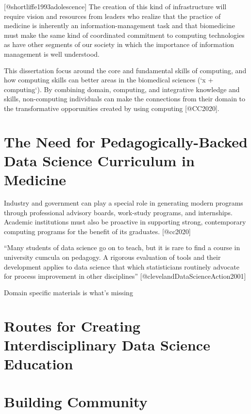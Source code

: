 \documentclass[../main.tex]{subfiles}
\begin{document}
        [@shortliffe1993adolescence]
        The creation of this kind of infrastructure will require vision and resources from leaders who realize that the practice of medicine is inherently an information-management task and that biomedicine must make the same kind of coordinated commitment to computing technologies as have other segments of our society in which the importance of information management is well understood.

        This dissertation focus around the core and fundamental skills
        of computing, and how computing skills can better areas in the biomedical sciences (`x + computing`).
        By combining domain, computing, and integrative knowledge and skills,
        non-computing individuals can make the connections from their domain to the transformative opporunities
        created by using computing [@CC2020].

    \section{The Need for Pedagogically-Backed Data Science Curriculum in Medicine}
        \label{se:intro-ds-edu-gaps}
        
        Industry and government can play a special role in generating modern programs through
        professional advisory boards, work-study programs, and internships.
        Academic institutions must also be proactive in
        supporting strong, contemporary computing programs for the benefit of its graduates. [@cc2020]
    
        ``Many students of data science
        go on to teach, but it is rare to find a course in university cumcula on pedagogy.
        A
        rigorous evaluation
        of tools and their development applies to data science that which statisticians routinely advocate for
        process improvement in other disciplines'' [@clevelandDataScienceAction2001]
        
        Domain specific materials is what's missing
        

    \section{Routes for Creating Interdisciplinary Data Science Education}

    \section{Building Community}
\end{document}
